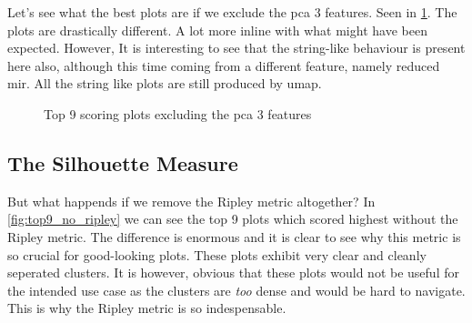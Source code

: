 \documentclass[11pt]{article}
\begin{document}
Let's see what the best plots are if we exclude the pca 3 features. Seen in \ref{fig:top9_no_pca3}. The plots are drastically different. A lot more inline with what might have been expected. However, It is interesting to see that the string-like behaviour is present here also, although this time coming from a different feature, namely reduced mir. All the string like plots are still produced by umap.

\begin{figure}[htbp]
\centering
{}
\caption{Top 9 scoring plots excluding the pca 3 features}
\label{fig:top9_no_pca3}
\end{figure}

\subsection{The Silhouette Measure}

But what happends if we remove the Ripley metric altogether? In \ref{fig:top9_no_ripley} we can see the top 9 plots which scored highest without the Ripley metric. The difference is enormous and it is clear to see why this metric is so crucial for good-looking plots. These plots exhibit very clear and cleanly seperated clusters. It is however, obvious that these plots would not be useful for the intended use case as the clusters are \textit{too} dense and would be hard to navigate. This is why the Ripley metric is so indespensable.
\end{document}
